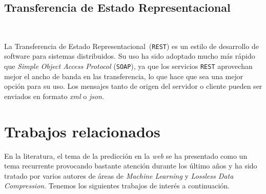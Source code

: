\subsection{Transferencia de Estado Representacional}~\label{concept-rest}

La Transferencia de Estado Representacional~(\texttt{REST}) es un estilo de desarrollo de software para sistemas distribuidos. Su uso ha sido adoptado mucho más rápido que  \emph{Simple Object Access Protocol} (\texttt{SOAP}), ya que los servicios \texttt{REST} aprovechan mejor el ancho de banda en las transferencia, lo que hace que sea una mejor opción para su uso. Los mensajes tanto de origen del servidor o cliente pueden ser enviados en formato \emph{xml} o \emph{json}. 



\section{Trabajos relacionados}

En la literatura, el tema de la predicción en la \emph{web} se ha presentado como un tema recurrente provocando bastante atención durante los último años y ha sido tratado por varios autores de áreas de \emph{Machine Learning} y \emph{Lossless Data Compression}. Tenemos los siguientes trabajos de interés a continuación.





